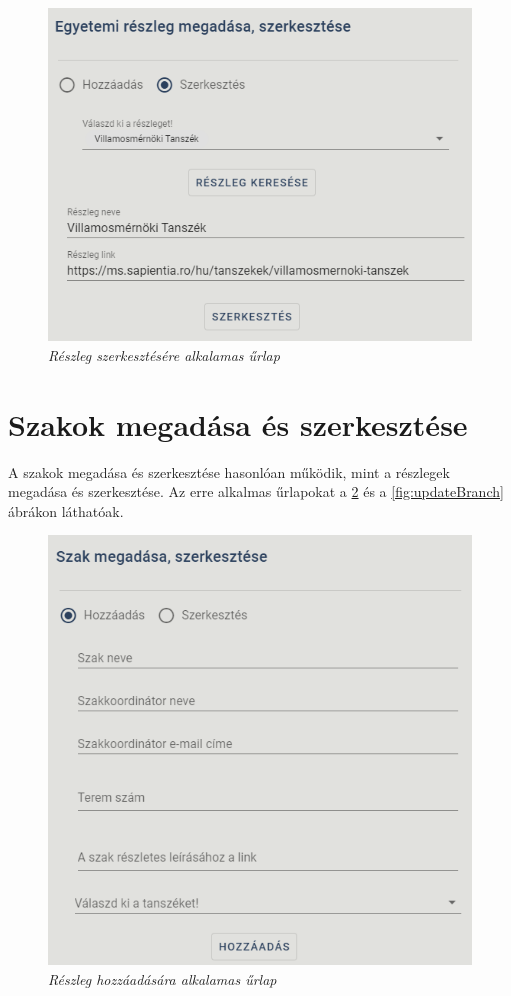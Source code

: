 \begin{figure}[H]
	\centering
	\includegraphics[width=0.7\linewidth]{figures/images/reszlegSzerkesztese.png}
	\caption[Részleg szerkesztésére alkalamas űrlap]{\textit{Részleg szerkesztésére alkalamas űrlap}}
	\label{fig:updateDepartmentUI}
\end{figure}

\section{Szakok megadása és szerkesztése}
A szakok megadása és szerkesztése hasonlóan működik, mint a részlegek megadása és szerkesztése. Az erre alkalmas űrlapokat a \ref{fig:addBranch} és a \ref{fig:updateBranch} ábrákon láthatóak.
\begin{figure}[H]
	\centering
	\includegraphics[width=0.7\linewidth]{figures/images/szakMegadasa.png}
	\caption[Szak hozzáadására alkalamas űrlap]{\textit{Részleg hozzáadására alkalamas űrlap}}
	\label{fig:addBranch}
\end{figure}

